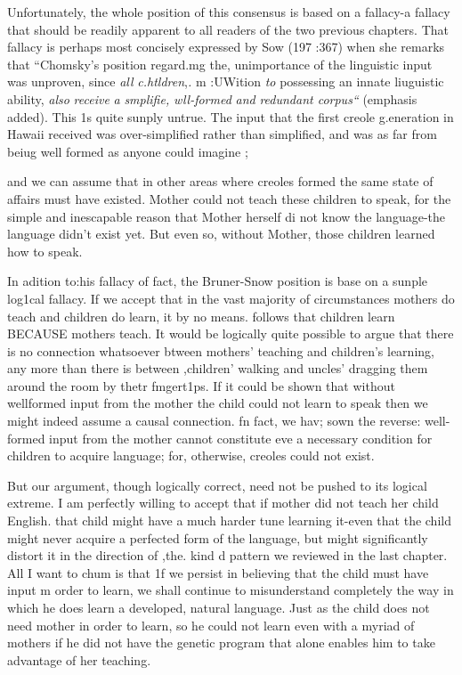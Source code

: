 Unfortunately, the whole position of this consensus is based on a fallacy-a fallacy that should be readily apparent to all readers of the two previous chapters. That fallacy is perhaps most concisely expressed
by Sow (197 :367) when she remarks that ``Chomsky's position regard.mg the, unimportance of the linguistic input was unproven, since \textit{all} \textit{c}\textit{.}\textit{htldren},\textit{.} m :UWition \textit{to} possessing an innate liuguistic ability, \textit{also} \textit{receive} \textit{a} \textit{smplifie,} \textit{wll-formed} \textit{and} \textit{redundant corpus``} (emphasis added). This 1s quite sunply untrue. The input that the first creole g.eneration in Hawaii received was over-simplified rather than simpli\-fied, and was as far from beiug well formed as anyone could imagine ;

and we can assume that in other areas where creoles formed the same state of affairs must have existed. Mother could not teach these children to speak, for the simple and inescapable reason that Mother herself di not know the language-the language didn't exist yet. But even so, without Mother, those children learned how to speak.

In adition to:his fallacy of fact, the Bruner-Snow position is base on a sunple log1cal fallacy. If we accept that in the vast majority of circumstances mothers do teach and children do learn, it by no means. follows that children learn BECAUSE mothers teach. It would be logically quite possible to argue that there is no connection whatso\-ever btween mothers' teaching and children's learning, any more than there is between ,children' walking and uncles' dragging them around the room by thetr fmgert1ps. If it could be shown that without well\-formed input from the mother the child could not learn to speak then we might indeed assume a causal connection. fn fact, we hav; sown the reverse: well-formed input from the mother cannot constitute eve a necessary condition for children to acquire language; for, otherwise, creoles could not exist.

But our argument, though logically correct, need not be pushed to its logical extreme. I am perfectly willing to accept that if mother did not teach her child English. that child might have a much harder tune learning it-even that the child might never acquire a perfected form of the language, but might significantly distort it in the direction of ,the. kind d pattern we reviewed in the last chapter. All I want to chum is that 1f we persist in believing that the child must have input m order to learn, we shall continue to misunderstand completely the way in which he does learn a developed, natural language. Just as
the child does not need mother in order to learn, so he could not learn even with a myriad of mothers if he did not have the genetic program that alone enables him to take advantage of her teaching.


